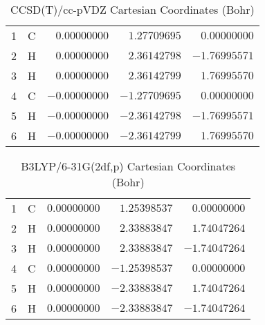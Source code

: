 \documentclass[10pt,oneside]{article}
\begin{document}
\begin{table}[h!]
\centering
\caption{CCSD(T)/cc-pVDZ Cartesian Coordinates (Bohr)}
\begin{tabular}{llrrr}
1  & C  & $ 0.00000000$ & $ 1.27709695$ & $ 0.00000000$ \\
2  & H  & $ 0.00000000$ & $ 2.36142798$ & $-1.76995571$ \\
3  & H  & $ 0.00000000$ & $ 2.36142799$ & $ 1.76995570$ \\
4  & C  & $-0.00000000$ & $-1.27709695$ & $ 0.00000000$ \\
5  & H  & $-0.00000000$ & $-2.36142798$ & $-1.76995571$ \\
6  & H  & $-0.00000000$ & $-2.36142799$ & $ 1.76995570$ \\
\end{tabular}
\end{table}

\begin{table}[h!]
\centering
\caption{B3LYP/6-31G(2df,p) Cartesian Coordinates (Bohr)}
\begin{tabular}{llrrr}
1  & C  & $ 0.00000000$ & $ 1.25398537$ & $ 0.00000000$ \\
2  & H  & $ 0.00000000$ & $ 2.33883847$ & $ 1.74047264$ \\
3  & H  & $ 0.00000000$ & $ 2.33883847$ & $-1.74047264$ \\
4  & C  & $ 0.00000000$ & $-1.25398537$ & $ 0.00000000$ \\
5  & H  & $ 0.00000000$ & $-2.33883847$ & $ 1.74047264$ \\
6  & H  & $ 0.00000000$ & $-2.33883847$ & $-1.74047264$ \\
\end{tabular}
\end{table}

\clearpage
\end{document}
